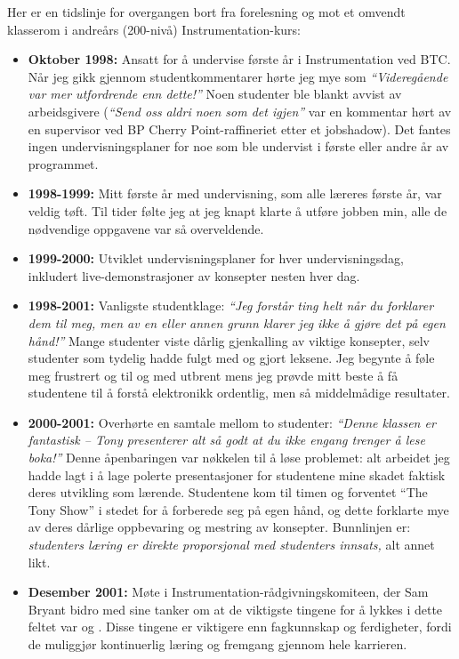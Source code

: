 
Her er en tidslinje for overgangen bort fra forelesning og mot et omvendt klasserom i andreårs (200-nivå) Instrumentation-kurs:

\begin{itemize}
\item{} {\bf Oktober 1998:} Ansatt for å undervise første år i Instrumentation ved BTC.  Når jeg gikk gjennom studentkommentarer hørte jeg mye som {\it ``Videregående var mer utfordrende enn dette!''}  Noen studenter ble blankt avvist av arbeidsgivere ({\it ``Send oss aldri noen som det igjen''} var en kommentar hørt av en supervisor ved BP Cherry Point-raffineriet etter et jobshadow).  Det fantes ingen undervisningsplaner for noe som ble undervist i første eller andre år av programmet.
\vskip 10pt
\item{} {\bf 1998-1999:} Mitt første år med undervisning, som alle læreres første år, var veldig tøft.  Til tider følte jeg at jeg knapt klarte å utføre jobben min, alle de nødvendige oppgavene var så overveldende.
\vskip 10pt
\item{} {\bf 1999-2000:} Utviklet undervisningsplaner for hver undervisningsdag, inkludert live-demonstrasjoner av konsepter nesten hver dag.
\vskip 10pt
\item{} {\bf 1998-2001:} Vanligste studentklage: {\it ``Jeg forstår ting helt når du forklarer dem til meg, men av en eller annen grunn klarer jeg ikke å gjøre det på egen hånd!''}  Mange studenter viste dårlig gjenkalling av viktige konsepter, selv studenter som tydelig hadde fulgt med og gjort leksene.  Jeg begynte å føle meg frustrert og til og med utbrent mens jeg prøvde mitt beste å få studentene til å forstå elektronikk ordentlig, men så middelmådige resultater.
\vskip 10pt
\item{} {\bf 2000-2001:} Overhørte en samtale mellom to studenter: {\it ``Denne klassen er fantastisk -- Tony presenterer alt så godt at du ikke engang trenger å lese boka!''}  Denne åpenbaringen var nøkkelen til å løse problemet: alt arbeidet jeg hadde lagt i å lage polerte presentasjoner for studentene mine skadet faktisk deres utvikling som lærende.  Studentene kom til timen og forventet ``The Tony Show'' i stedet for å forberede seg på egen hånd, og dette forklarte mye av deres dårlige oppbevaring og mestring av konsepter.  Bunnlinjen er: {\it studenters læring er direkte proporsjonal med studenters innsats,} alt annet likt.
\vskip 10pt
\item{} {\bf Desember 2001:} Møte i Instrumentation-rådgivningskomiteen, der Sam Bryant bidro med sine tanker om at de viktigste tingene for å lykkes i dette feltet var  og .  Disse tingene er viktigere enn fagkunnskap og ferdigheter, fordi de muliggjør kontinuerlig læring og fremgang gjennom hele karrieren.

\end{itemize}
